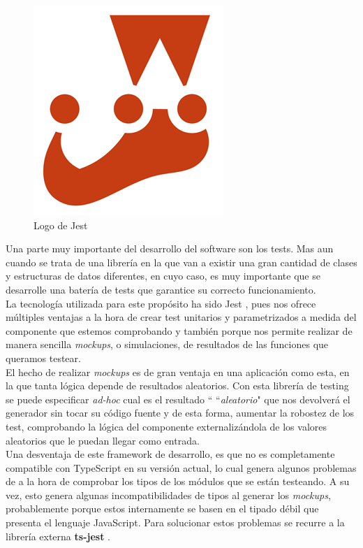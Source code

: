 \begin{figure}[ht]
    \centering
    \includegraphics[scale=0.3]{mem/images/cap-4/4.1.2(desarrollo)/jest-logo.png}
    \caption{Logo de Jest}
    \label{fig:jest}
\end{figure}
 
 Una parte muy importante del desarrollo del software son los tests. Mas aun cuando se trata de una librería en la que van a existir una gran cantidad de clases y estructuras de datos diferentes, en cuyo caso, es muy importante que se desarrolle una batería de tests que garantice su correcto funcionamiento. \\
 
 La tecnología utilizada para este propósito ha sido Jest \cite{jest}, pues nos ofrece múltiples ventajas a la hora de crear test unitarios y parametrizados a medida del componente que estemos comprobando y también porque nos permite realizar de manera sencilla \textit{mockups}, o simulaciones, de resultados de las funciones que queramos testear. \\
 
 El hecho de realizar \textit{mockups} es de gran ventaja en una aplicación como esta, en la que tanta lógica depende de resultados aleatorios. Con esta librería de testing se puede especificar \textit{ad-hoc} cual es el resultado `` ``\textit{aleatorio}" que nos devolverá el generador sin tocar su código fuente y de esta forma, aumentar la robostez de los test, comprobando la lógica del componente externalizándola de los valores aleatorios que le puedan llegar como entrada. \\
 
 Una desventaja de este framework de desarrollo, es que no es completamente compatible con TypeScript en su versión actual, lo cual genera algunos problemas de a la hora de comprobar los tipos de los módulos que se están testeando. A su vez, esto genera algunas incompatibilidades de tipos al generar los \textit{mockups}, probablemente porque estos internamente se basen en el tipado débil que presenta el lenguaje JavaScript. Para solucionar estos problemas se recurre a la librería externa \textbf{ts-jest} \cite{tsjest}. \\
 
